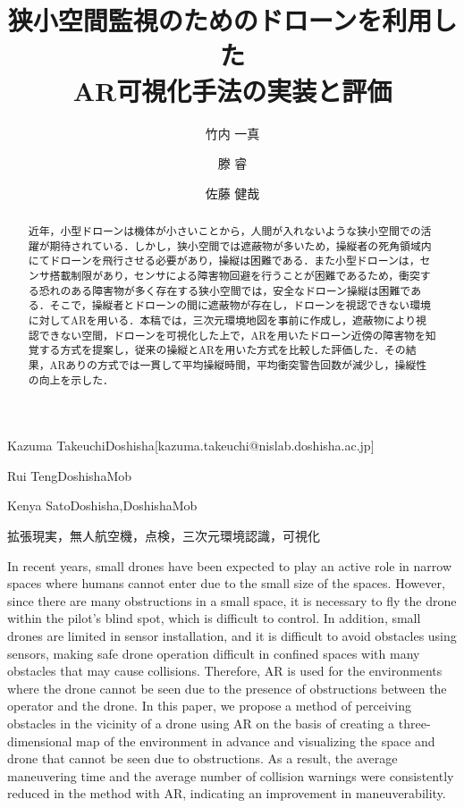 \documentclass[submit]{ipsj}
\begin{document}
\title{狭小空間監視のためのドローンを利用した\\ AR可視化手法の実装と評価}




\author{竹内 一真}{Kazuma Takeuchi}{Doshisha}[kazuma.takeuchi@nislab.doshisha.ac.jp]
\author{滕 睿}{Rui Teng}{DoshishaMob}
\author{佐藤 健哉}{Kenya Sato}{Doshisha,DoshishaMob}

\begin{abstract}
近年，小型ドローンは機体が小さいことから，人間が入れないような狭小空間での活躍が期待されている．しかし，狭小空間では遮蔽物が多いため，操縦者の死角領域内にてドローンを飛行させる必要があり，操縦は困難である．また小型ドローンは，センサ搭載制限があり，センサによる障害物回避を行うことが困難であるため，衝突する恐れのある障害物が多く存在する狭小空間では，安全なドローン操縦は困難である．そこで，操縦者とドローンの間に遮蔽物が存在し，ドローンを視認できない環境に対してARを用いる．本稿では，三次元環境地図を事前に作成し，遮蔽物により視認できない空間，ドローンを可視化した上で，ARを用いたドローン近傍の障害物を知覚する方式を提案し，従来の操縦とARを用いた方式を比較した評価した．その結果，ARありの方式では一貫して平均操縦時間，平均衝突警告回数が減少し，操縦性の向上を示した．
\end{abstract}

\begin{jkeyword}
拡張現実，無人航空機，点検，三次元環境認識，可視化
\end{jkeyword}

\begin{eabstract}
In recent years, small drones have been expected to play an active role in narrow spaces where humans cannot enter due to the small size of the spaces. However, since there are many obstructions in a small space, it is necessary to fly the drone within the pilot's blind spot, which is difficult to control. In addition, small drones are limited in sensor installation, and it is difficult to avoid obstacles using sensors, making safe drone operation difficult in confined spaces with many obstacles that may cause collisions. Therefore, AR is used for the environments where the drone cannot be seen due to the presence of obstructions between the operator and the drone. In this paper, we propose a method of perceiving obstacles in the vicinity of a drone using AR on the basis of creating a three-dimensional map of the environment in advance and visualizing the space and drone that cannot be seen due to obstructions. As a result, the average maneuvering time and the average number of collision warnings were consistently reduced in the method with AR, indicating an improvement in maneuverability.
\end{eabstract}
\end{document}
